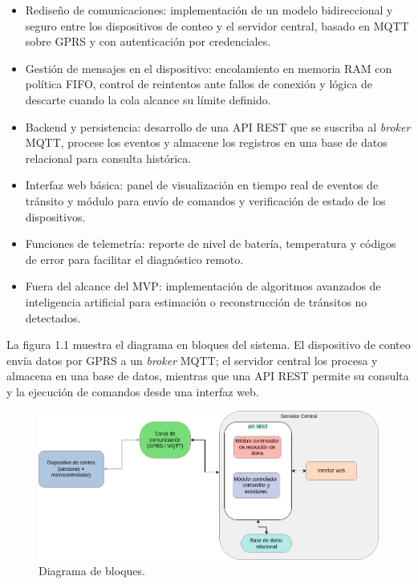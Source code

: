 \begin{itemize}

\item Rediseño de comunicaciones: implementación de un modelo bidireccional y seguro entre los dispositivos de conteo y el servidor central, basado en MQTT sobre GPRS y con autenticación por credenciales.

\item Gestión de mensajes en el dispositivo: encolamiento en memoria RAM con política FIFO, control de reintentos ante fallos de conexión y lógica de descarte cuando la cola alcance su límite definido.

\item Backend y persistencia: desarrollo de una API REST que se suscriba al \textit{broker} MQTT, procese los eventos y almacene los registros en una base de datos relacional para consulta histórica.

\item Interfaz web básica: panel de visualización en tiempo real de eventos de tránsito y módulo para envío de comandos y verificación de estado de los dispositivos.

\item Funciones de telemetría: reporte de nivel de batería, temperatura y códigos de error para facilitar el diagnóstico remoto.

\item  Fuera del alcance del MVP: implementación de algoritmos avanzados de inteligencia artificial para estimación o reconstrucción de tránsitos no detectados. 
\end{itemize}

La figura 1.1 muestra el diagrama en bloques del sistema. El dispositivo de conteo envía datos por GPRS a un \textit{broker} MQTT; el servidor central los procesa y almacena en una base de datos, mientras que una API REST permite su consulta y la ejecución de comandos desde una interfaz web.

\vspace{1cm}

\begin{figure}[htbp]
	\centering
	\includegraphics[width=.98\textwidth]{./Figures/diagBloques.png}
	\caption{Diagrama de bloques.}
	\label{fig:texmaker}
\end{figure}

\vspace{1cm}











